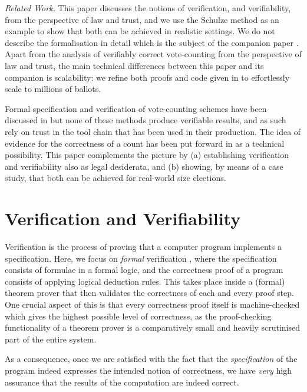 \documentclass{llncs}
\begin{document}
\smallskip\noindent\emph{Related Work.}  This paper discusses the
notions of verification, and verifiability, from the perspective of
law and trust, and we use the Schulze method as an example to show
that both can be achieved in realistic settings. We do not describe
the formalisation in detail which is the subject of the companion
paper
\cite{Pattinson:2017:SVE}. Apart from the analysis of verifiably
correct vote-counting from the perspective of law and trust, the
main technical differences between this paper and its companion is
scalability: we refine both proofs and code given in
\cite{Pattinson:2017:SVE} to effortlessly scale to millions of
ballots.

Formal specification and verification of
vote-counting schemes have been discussed in
\cite{Beckert:2014:VVS,Cochran:2010:VFS} but none of these methods
produce verifiable results, and as such rely on trust in the tool
chain that has been used in their production. The idea of evidence
for the correctness of a count has been put forward in 
\cite{Pattinson:2015:VCM} as a technical possibility. This paper
complements the picture by (a) establishing verification and
verifiability also as legal desiderata, and (b) showing, by means of
a case study, that both can be achieved for real-world size
elections. 


\section{Verification and Verifiability} \label{sec:verif}

Verification is the process of proving that a computer
program implements a specification. Here, we focus on \emph{formal}
verification \cite{Hales:2008:FP}, where the specification consists of formulae in
a formal logic, and the correctness proof of a program consists of
applying logical deduction rules. This takes place inside
a (formal) theorem prover that then validates the correctness of
each and every proof step. One crucial aspect of this is that every
correctness proof itself is machine-checked which gives the highest
possible level of correctness, as the proof-checking functionality
of a theorem prover is a comparatively small and heavily scrutinised
part of the entire system.

As a consequence, once we are satisfied with the fact that the
\emph{specification} of the program indeed expresses the intended
notion of correctness, we have \emph{very} high assurance that the
results of the computation are indeed correct. 
\end{document}
